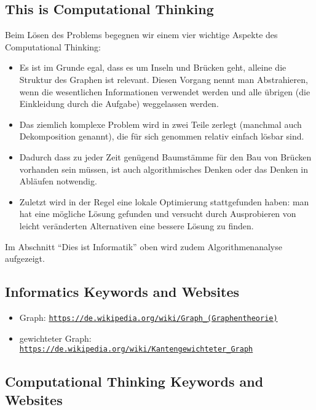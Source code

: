 \documentclass[a4paper,11pt]{report}
\newcommand{\BrochureUrlText}[1]{\texttt{#1}}
\begin{document}
\subsection*{This is Computational Thinking}

Beim Lösen des Problems begegnen wir einem vier wichtige Aspekte des Computational Thinking:

\begin{itemize}
  \item Es ist im Grunde egal, dass es um Inseln und Brücken geht, alleine die Struktur des Graphen ist relevant. Diesen Vorgang nennt man Abstrahieren, wenn die wesentlichen Informationen verwendet werden und alle übrigen (die Einkleidung durch die Aufgabe) weggelassen werden.
  \item Das ziemlich komplexe Problem wird in zwei Teile zerlegt (manchmal auch Dekomposition genannt), die für sich genommen relativ einfach lösbar sind.
  \item Dadurch dass zu jeder Zeit genügend Baumstämme für den Bau von Brücken vorhanden sein müssen, ist auch algorithmisches Denken oder das Denken in Abläufen notwendig.
  \item Zuletzt wird in der Regel eine lokale Optimierung stattgefunden haben: man hat eine mögliche Lösung gefunden und versucht durch Ausprobieren von leicht veränderten Alternativen eine bessere Lösung zu finden.
\end{itemize}

Im Abschnitt \enquote{Dies ist Informatik} oben wird zudem Algorithmenanalyse aufgezeigt.


\subsection*{Informatics Keywords and Websites}

\begin{itemize}
  \item Graph: \href{https://de.wikipedia.org/wiki/Graph_(Graphentheorie)}{\BrochureUrlText{https://de.wikipedia.org/wiki/Graph\_(Graphentheorie)}}
  \item gewichteter Graph: \href{https://de.wikipedia.org/wiki/Kantengewichteter_Graph}{\BrochureUrlText{https://de.wikipedia.org/wiki/Kantengewichteter\_Graph}}
\end{itemize}


\subsection*{Computational Thinking Keywords and Websites}
\end{document}
